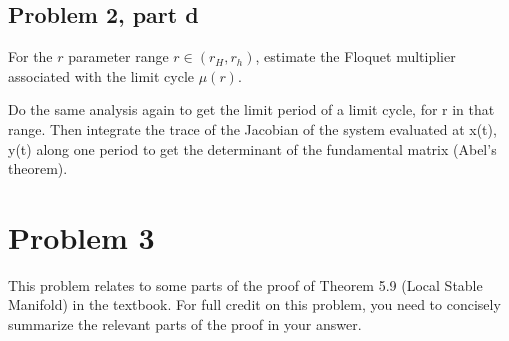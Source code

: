 \newpage
\subsection{Problem 2, part d}
For the $r$ parameter range $r \in (r_H, r_h)$, estimate the Floquet multiplier associated with the limit cycle $\mu(r)$. 
\partbreak
\begin{solution}

    Do the same analysis again to get the limit period of a limit cycle, for r in that range. Then integrate the trace of the Jacobian of the system evaluated at x(t), y(t) along one period to get the determinant of the fundamental matrix (Abel's theorem). 
\end{solution}
\newpage
\section{Problem 3}
This problem relates to some parts of the proof of Theorem 5.9 (Local Stable Manifold) in the textbook. For full credit on this problem, you need to concisely summarize the relevant parts of the proof in your answer.  

